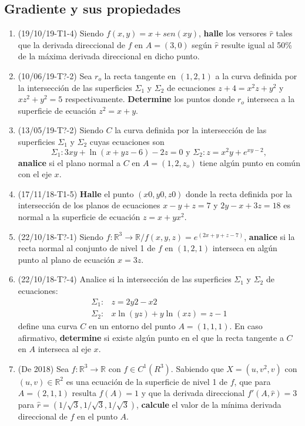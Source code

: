 \documentclass[12pt,a4paper]{article}
\renewcommand{\b}[1]{\textbf{#1}}
\newcommand{\R}{\mathbb{R}}
\begin{document}
\subsection{Gradiente y sus propiedades}
\begin{enumerate}
	\item (19/10/19-T1-4) Siendo $ f ( x, y ) = x + sen ( x y )  $, \b{halle} los versores $ \hat{r} $ tales que la derivada direccional de $ f $ en $ A = ( 3, 0 ) $ según $\hat{r}$ resulte igual al 50\% de la máxima derivada direccional en dicho punto.
	
	\item (10/06/19-T?-2) Sea $ r_o $ la recta tangente en $ ( 1, 2, 1 ) $ a la curva definida por la intersección de las superficies $ \Sigma_1 $ y $ \Sigma_2 $ de ecuaciones $ z + 4 = x^2 z + y^2 $ y $ x z^2 + y^2 = 5 $ respectivamente. \b{Determine} los puntos donde $ r_o $ interseca a la superficie de ecuación $ z^2 = x + y  $.
	
	\item (13/05/19-T?-2) Siendo $ C $ la curva definida por la intersección de las superficies  $ \Sigma_1 $ y $ \Sigma_2 $ cuyas ecuaciones son
	\[\Sigma_1 : 3 x y + \ln( x + y z - 6 ) - 2 z = 0 \text{ y } \Sigma_2 : z = x^2 y + e^{	x y - 2},\]
	\b{analice} si el plano normal a $ C $ en $ A = ( 1, 2, z_o ) $ tiene algún punto en común con el eje $ x  $.
	
	\item (17/11/18-T1-5) \b{Halle} el punto $ ( x 0, y 0, z 0 ) $ donde la recta definida por la intersección de los planos de ecuaciones $ x - y + z = 7 $ y $ 2 y - x + 3 z = 18 $ es normal a la superficie de ecuación $ z = x + y x^2  $.
	
	\item (22/10/18-T?-1) Siendo $ f : \R^3\rightarrow\R / f ( x, y, z ) = e^{(2x+y+z-7)}$, \b{analice} si la recta normal al conjunto de nivel 1 de $ f $ en $ ( 1, 2, 1 ) $ interseca en algún punto al plano de ecuación $ x = 3 z  $.
	
	\item (22/10/18-T?-4) Analice si la intersección de las superficies $\Sigma_1$ y $ \Sigma_2 $ de ecuaciones:
	\begin{align}
		\Sigma_1 :& z = 2 y 2 - x 2\\
		\Sigma_2 :& x \ln( y z ) + y \ln( x z ) = z - 1
	\end{align}
	define una curva $ C $ en un entorno del punto $ A = ( 1, 1, 1 )  $. En caso afirmativo, \b{determine} si existe algún punto en el que la recta tangente a $ C $ en $ A $ interseca al eje $ x  $.
	
	\item (De 2018) Sea $ f : \R^3\rightarrow \R $ con $ f \in C^1 (R^3)$. Sabiendo que $ X = (u, v^2, v) $ con $ (u, v) \in \R^2 $ es una ecuación de la superficie de nivel 1 de $ f $, que para $ A = (2, 1, 1) $ resulta $ f(A) = 1 $ y que la derivada direccional $ f'(A, \hat{r}) = 3 $ para $ \hat{r}=(1/\sqrt{ 3}, 1/\sqrt{ 3}, 1/\sqrt{ 3}) $, \b{calcule}  el valor de la mínima derivada direccional de $ f $ en el punto $ A $.
	
\end{enumerate}
\end{document}
